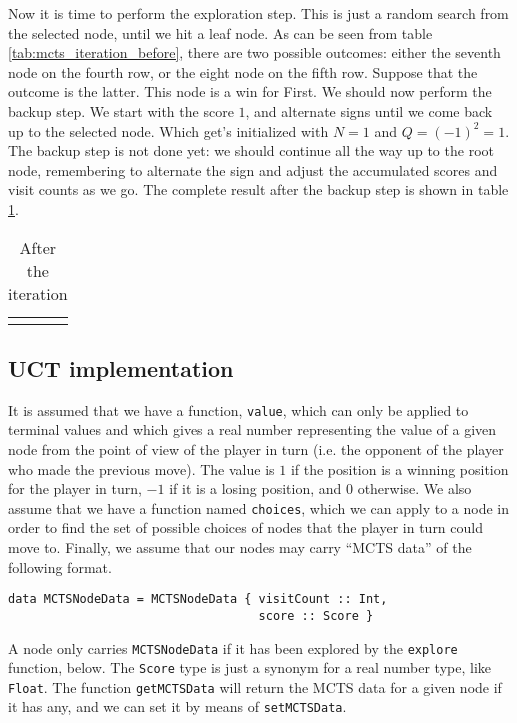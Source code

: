 Now it is time to perform the exploration step.
This is just a random search from the selected node, until we hit a leaf node.
As can be seen from table \ref{tab:mcts_iteration_before}, there are two possible outcomes: either the seventh node on the fourth row, or the eight node on the fifth row.
Suppose that the outcome is the latter.
This node is a win for First.
We should now perform the backup step. We start with the score $1$, and alternate signs until we come back up to the selected node. Which get's initialized with $N=1$ and $Q=(-1)^2 = 1$.
The backup step is not done yet: we should continue all the way up to the root node, remembering to alternate the sign and adjust the accumulated scores and visit counts as we go.
The complete result after the backup step is shown in table \ref{fig:mcts_iteration_after}.
\begin{center}
\def\arraystretch{5.5}
\begin{table}
\begin{tabular}{l}
  \def\svgwidth{\columnwidth} 
\end{tabular}
\caption{After the iteration}
\label{fig:mcts_iteration_after}
\end{table}
\end{center}

\subsection{UCT implementation}

It is assumed that we have a function, \texttt{value}, which can only be applied to terminal values and which gives a real number representing the value of a given node from the point of view of the player in turn (i.e. the opponent of the player who made the previous move). The value is $1$ if the position is a winning position for the player in turn, $-1$ if it is a losing position, and $0$ otherwise.
We also assume that we have a function named \texttt{choices}, which we can apply to a node in order to find the set of possible choices of nodes that the player in turn could move to. Finally, we assume that our nodes may carry ``MCTS data'' of the following format.
\begin{lstlisting}[frame=single]
data MCTSNodeData = MCTSNodeData { visitCount :: Int,
                                   score :: Score }
\end{lstlisting}
A node only carries \texttt{MCTSNodeData} if it has been explored by the \texttt{explore} function, below.
The \texttt{Score} type is just a synonym for a real number type, like \texttt{Float}. The function \texttt{getMCTSData} will return the MCTS data for a given node if it has any, and we can set it by means of \texttt{setMCTSData}.

